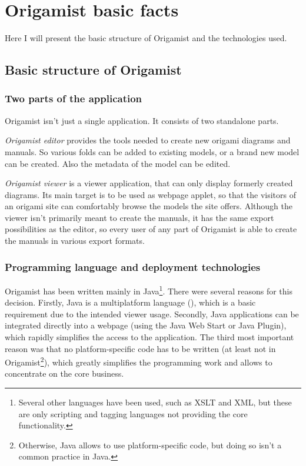 \chapter{Origamist basic facts}

Here I will present the basic structure of Origamist and the technologies used.

\section{Basic structure of Origamist}

\subsection{Two parts of the application}
Origamist isn't just a single application. It consists of two standalone parts. 

\emph{Origamist editor} provides the tools needed to create new origami diagrams and manuals. So various folds can be added to existing models, or a brand new model can be created. Also the metadata of the model can be edited.

\emph{Origamist viewer} is a viewer application, that can only display formerly created diagrams. Its main target is to be used as webpage applet, so that the visitors of an origami site can comfortably browse the models the site offers. Although the viewer isn't primarily meant to create the manuals, it has the same export possibilities as the editor, so every user of any part of Origamist is able to create the manuals in various export formats.

\subsection{Programming language and deployment technologies}
Origamist has been written mainly in Java\footnote{Several other languages have been used, such as XSLT and XML, but these are only scripting and tagging languages not providing the core functionality.}. There were several reasons for this decision. Firstly, Java is a multiplatform language (\cite{javasupport}), which is a basic requirement due to the intended viewer usage. Secondly, Java applications can be integrated directly into a webpage (using the Java Web Start or Java Plugin), which rapidly simplifies the access to the application.  The third most important reason was that no platform-specific code has to be written (at least not in Origamist\footnote{Otherwise, Java allows to use platform-specific code, but doing so isn't a common practice in Java.}), which greatly simplifies the programming work and allows to concentrate on the core business.

